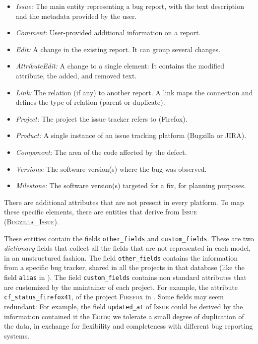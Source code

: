 \begin{itemize}[$\circ$]
\item {\it Issue:} The main entity representing a bug report, with the text description and the metadata provided by the user.
\item {\it Comment:} User-provided additional information on a report.
\item {\it Edit:} A change in the existing report. It can group several changes.
\item {\it AttributeEdit:} A change to a single element: It contains the modified attribute, the added, and removed text.
\item {\it Link:} The relation (if any) to another report. A link maps the connection and defines the type of relation (\eg parent or duplicate).
\item {\it Project:} The project the issue tracker refers to (\eg Firefox).
\item {\it Product:} A single instance of an issue tracking platform (\eg Bugzilla or JIRA).
\item {\it Component:} The area of the code affected by the defect.
\item {\it Versions:} The software version(s) where the bug was observed.
\item {\it Milestone:} The software version(s) targeted for a fix, for planning purposes.
\end{itemize}

There are additional attributes that are not present in every platform. To map these specific elements, there are entities that derive from \textsc{Issue} (\eg \textsc{Bugzilla\_Issue}).

These entities contain the fields \texttt{other\_fields} and \texttt{custom\_fields}. These are two \emph{dictionary} fields that collect all the fields that are not represented in each model, in an unstructured fashion. The field \texttt{other\_fields} contains the information from a specific bug tracker, shared in all the projects in that database (like the field \texttt{alias} in \bzilla). The field \texttt{custom\_fields} contains non standard attributes that are customized by the maintainer of each project. For example, the attribute \texttt{cf\_status\_firefox41}, of the project \textsc{Firefox} in \bzilla. Some fields may seem redundant: For example, the field \texttt{updated\_at} of \textsc{Issue} could be derived by the information contained it the \textsc{Edit}s; we tolerate a small degree of duplication of the data, in exchange for flexibility and completeness with different bug reporting systems.



